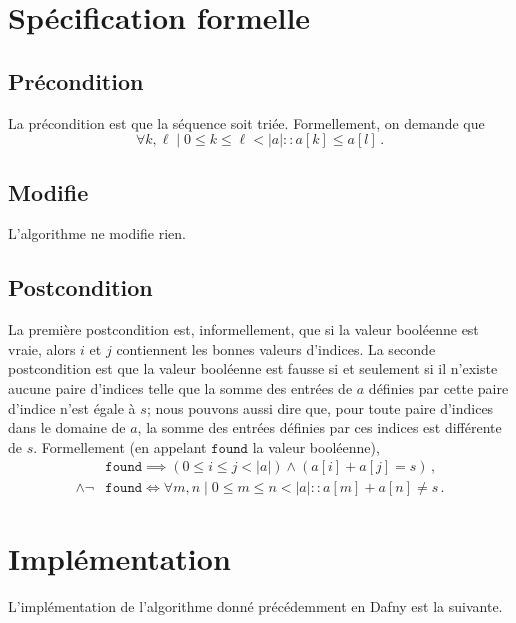 \documentclass{elsarticle}
\newcommand{\abs}[1]{\left\lvert#1\right\lvert}
\begin{document}
\section{Spécification formelle}
\subsection{Précondition}
La précondition est que la séquence soit triée.
Formellement, on demande que
\[
\forall k, \ell \mid 0 \le k \le \ell < \abs{a} :: a[k] \le a[l]\,.
\]
\subsection{Modifie}
L'algorithme ne modifie rien.
\subsection{Postcondition}
La première postcondition est, informellement, que si la valeur booléenne est vraie,
alors $i$ et $j$ contiennent les bonnes valeurs d'indices.
La seconde postcondition est que la valeur booléenne est fausse si et seulement si il n'existe aucune paire d'indices telle que la somme des entrées de $a$ définies par cette paire d'indice n'est égale à $s$; nous pouvons aussi dire que, pour toute paire d'indices dans le domaine de $a$, la somme des entrées définies par ces indices est différente de $s$.
Formellement (en appelant $\texttt{found}$ la valeur booléenne),
\begin{align*}
&\texttt{found} \implies (0 \le i \le j < \abs{a}) \land (a[i] + a[j] = s)\,, \\
\land \lnot &\texttt{found} \iff \forall m, n \mid 0 \le m \le n < \abs{a} :: a[m] + a[n] \ne s\,.
\end{align*}

\section{Implémentation}
L'implémentation de l'algorithme donné précédemment en Dafny est la suivante.
\end{document}
